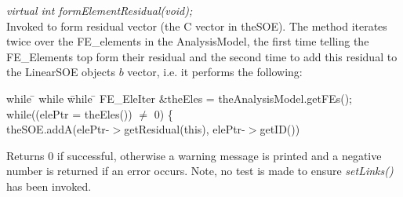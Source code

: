 {\em virtual int formElementResidual(void);} \\
Invoked to form residual vector (the C vector in theSOE). The method
iterates twice over the FE\_elements in the AnalysisModel, the first
time telling the FE\_Elements top form their residual and the second
time to add this residual to the LinearSOE objects $b$ vector, i.e. it
performs the following:
\begin{tabbing}
while \= \+ while \= while \= \kill
FE\_EleIter \&theEles = theAnalysisModel.getFEs();\\
while((elePtr = theEles()) $\neq$ 0) \{ \+ \\
theSOE.addA(elePtr-$>$getResidual(this), elePtr-$>$getID()) \+ \\ 
\end{tabbing}
\noindent Returns $0$ if successful, otherwise a warning message is
printed and a negative number is returned if an error occurs. Note, no
test is made to ensure {\em setLinks()} has been invoked.\\




